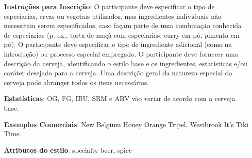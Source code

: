 \textbf{Instruções para Inscrição}: O participante deve especificar o tipo de especiarias, ervas ou vegetais utilizados, mas ingredientes individuais não necessitam serem especificados, caso façam parte de uma combinação conhecida de especiarias (p. ex., torta de maçã com especiarias, curry em pó, pimenta em pó). O participante deve especificar o tipo de ingrediente adicional (como na introdução) ou processo especial empregado. O participante deve fornecer uma descrição da cerveja, identificando o estilo base e os ingredientes, estatísticas e/ou caráter desejado para a cerveja. Uma descrição geral da natureza especial da cerveja pode abranger todos os itens necessários.

\textbf{Estatísticas}: OG, FG, IBU, SRM e ABV vão variar de acordo com a cerveja base.

\textbf{Exemplos Comerciais}: New Belgium Honey Orange Tripel, Westbrook It's Tiki Time.

\textbf{Atributos do estilo}: specialty-beer, spice
